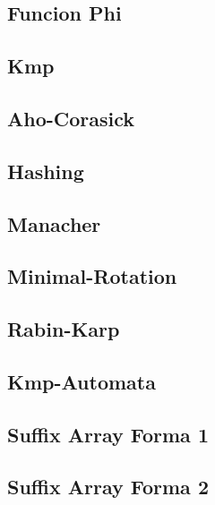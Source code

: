 \subsection{Funcion Phi}
\raggedbottom
\hrulefill
\subsection{Kmp}
\raggedbottom
\hrulefill
\subsection{Aho-Corasick}
\raggedbottom
\hrulefill
\subsection{Hashing}
\raggedbottom
\hrulefill
\subsection{Manacher}
\raggedbottom
\hrulefill
\subsection{Minimal-Rotation}
\raggedbottom
\hrulefill
\subsection{Rabin-Karp}
\raggedbottom
\hrulefill
\subsection{Kmp-Automata}
\raggedbottom
\hrulefill
\subsection{Suffix Array Forma 1}
\raggedbottom
\hrulefill
\subsection{Suffix Array Forma 2}
\raggedbottom
\hrulefill
